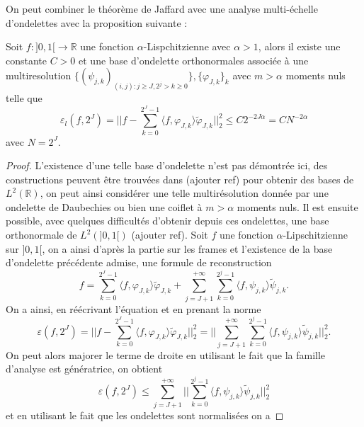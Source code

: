 On peut combiner le théorème de Jaffard avec une analyse multi-échelle d'ondelettes avec la proposition suivante :
\begin{proposition}
	Soit $f:]0,1[ \to \mathbb{R}$ une fonction $\alpha$-Lispchitzienne avec $\alpha>1$, alors il existe une constante $C>0$ et une base d'ondelette orthonormales associée à une multiresolution $\{(\psi_{j,k})_{(i,j): j\geq J, 2^{j} > k\geq 0}\}, \{\varphi_{J,k}\}_k$ avec $m>\alpha$ moments nuls telle que  
	\begin{equation}
		\varepsilon_l(f, 2^J) = ||f - \sum_{k=0}^{2^J -1} \langle f, \varphi_{J,k}\rangle \tilde{\varphi}_{J,k}||_2^2 \leq C 2^{-2J\alpha} = CN^{-2\alpha}
	\end{equation}
	avec $N=2^J$.
\end{proposition}
\begin{proof}
	L'existence d'une telle base d'ondelette n'est pas démontrée ici, des constructions peuvent être trouvées dans (ajouter ref) pour obtenir des bases de $L^2(\mathbb{R})$, on peut ainsi considérer une telle multirésolution donnée par une ondelette de Daubechies ou bien une coiflet à $m>\alpha$ moments nuls.
	Il est ensuite possible, avec quelques difficultés d'obtenir depuis ces ondelettes, une base orthonormale de $L^2(]0,1[)$ (ajouter ref).
	Soit $f$ une fonction $\alpha$-Lipschitzienne sur $]0,1[$, on a ainsi d'après la partie sur les frames et l'existence de la base d'ondelette précédente admise, une formule de reconstruction
	\begin{equation*}
		f = \sum_{k=0}^{2^J -1} \langle f, \varphi_{J,k}\rangle \tilde{\varphi}_{J,k} + \sum_{j=J+1}^{+\infty}\sum_{k=0}^{2^j-1} \langle f, \psi_{j,k} \rangle \tilde{\psi}_{j,k}. 
	\end{equation*}
	On a ainsi, en réécrivant l'équation et en prenant la norme
	\begin{equation*}
		\varepsilon(f, 2^J) = ||f - \sum_{k=0}^{2^J -1} \langle f, \varphi_{J,k}\rangle \tilde{\varphi}_{J,k}||_2^2 =|| \sum_{j=J+1}^{+\infty}\sum_{k=0}^{2^j-1} \langle f, \psi_{j,k} \rangle \tilde{\psi}_{j,k}||_2^2. 
	\end{equation*}
	On peut alors majorer le terme de droite en utilisant le fait que la famille d'analyse est génératrice, on obtient
	\begin{equation*}
		\varepsilon(f, 2^J) \leq \sum_{j=J+1}^{+\infty} ||\sum_{k=0}^{2^j -1} \langle f, \psi_{j,k} \rangle \tilde{\psi}_{j,k} ||_2^2
	\end{equation*}
	et en utilisant le fait que les ondelettes sont normalisées on a

\end{proof}
